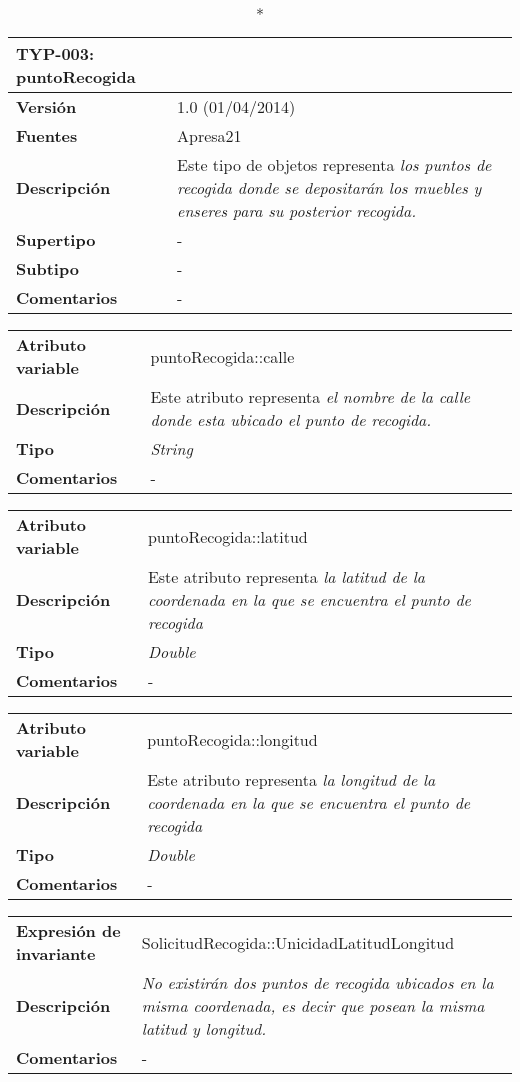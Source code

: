 
\begin{longtable}{p{2.5cm}  p{14cm}}
\caption*{\textbf{TYP-003: puntoRecogida}} \\
\hline
\textbf{Versión} & 1.0 (01/04/2014) \\
\textbf{Fuentes} & Apresa21 \\
\textbf{Descripción} & Este tipo de objetos representa  \textit{los puntos de recogida donde se depositarán los muebles y enseres para su posterior recogida.} \\
\textbf{Supertipo} & - \\
\textbf{Subtipo} & -  \\
\textbf{Comentarios} &- \\
\end{longtable}

\begin{longtable}{p{3cm}  p{12cm}}
\hline
\textbf{Atributo variable} & puntoRecogida::calle \\
\textbf{Descripción} & Este atributo representa  \textit{el nombre de la calle donde esta ubicado el punto de recogida.} \\
\textbf{Tipo} & \textit{String} \\
\textbf{Comentarios} & - \\
\end{longtable}

\begin{longtable}{p{3cm}  p{12cm}}
\hline
\textbf{Atributo variable} & puntoRecogida::latitud \\
\textbf{Descripción} & Este atributo representa  \textit{la latitud de la coordenada en la que se encuentra el punto de recogida} \\
\textbf{Tipo} & \textit{Double} \\
\textbf{Comentarios} & - \\
\end{longtable}

\begin{longtable}{p{3cm}  p{12cm}}
\hline
\textbf{Atributo variable} & puntoRecogida::longitud \\
\textbf{Descripción} & Este atributo representa  \textit{la longitud de la coordenada en la que se encuentra el punto de recogida} \\
\textbf{Tipo} & \textit{Double} \\
\textbf{Comentarios} & - \\
\end{longtable}

\begin{longtable}{p{3cm}  p{12cm}}
\hline
\textbf{Expresión de invariante} & SolicitudRecogida::UnicidadLatitudLongitud \\
\textbf{Descripción} &  \textit{No existirán dos puntos de recogida ubicados en la misma coordenada, es decir que posean la misma latitud y longitud. } \\
\textbf{Comentarios} & -\\
\end{longtable}
